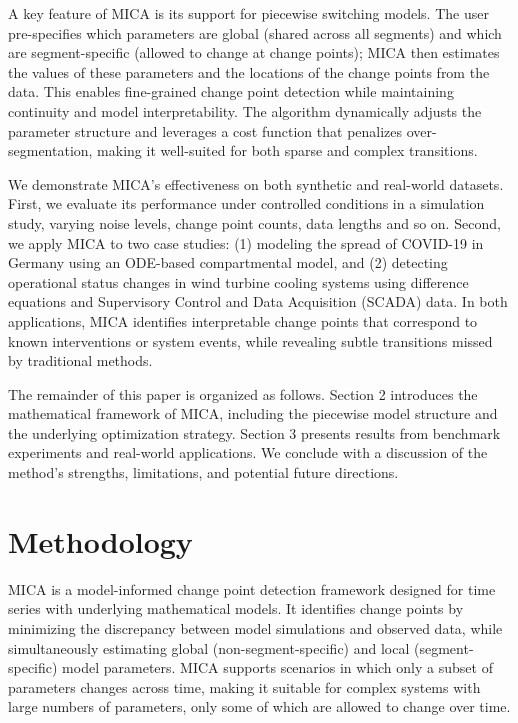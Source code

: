 \documentclass[10pt,letterpaper]{article}
\begin{document}
A key feature of MICA is its support for piecewise switching models. The user pre-specifies which parameters are global (shared across all segments) and which are segment-specific (allowed to change at change points); MICA then estimates the values of these parameters and the locations of the change points from the data. This enables fine-grained change point detection while maintaining continuity and model interpretability. The algorithm dynamically adjusts the parameter structure and leverages a cost function that penalizes over-segmentation, making it well-suited for both sparse and complex transitions.

We demonstrate MICA’s effectiveness on both synthetic and real-world datasets. First, we evaluate its performance under controlled conditions in a simulation study, varying noise levels, change point counts, data lengths and so on. Second, we apply MICA to two case studies: (1) modeling the spread of COVID-19 in Germany using an ODE-based compartmental model, and (2) detecting operational status changes in wind turbine cooling systems using difference equations and Supervisory Control and Data Acquisition (SCADA) data. In both applications, MICA identifies interpretable change points that correspond to known interventions or system events, while revealing subtle transitions missed by traditional methods.

The remainder of this paper is organized as follows. Section 2 introduces the mathematical framework of MICA, including the piecewise model structure and the underlying optimization strategy. Section 3 presents results from benchmark experiments and real-world applications. We conclude with a discussion of the method’s strengths, limitations, and potential future directions.

\section*{Methodology}
\label{s:model}

MICA is a model-informed change point detection framework designed for time series with underlying mathematical models. It identifies change points by minimizing the discrepancy between model simulations and observed data, while simultaneously estimating global (non-segment-specific) and local (segment-specific) model parameters. MICA supports scenarios in which only a subset of parameters changes across time, making it suitable for complex systems with large numbers of parameters, only some of which are allowed to change over time.
\end{document}
